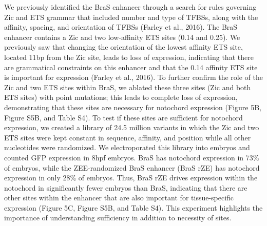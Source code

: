 We previously identified the BraS enhancer through a search for rules governing Zic and ETS grammar that included number and type of TFBSs, along with the affinity, spacing, and orientation of TFBSs (Farley et al., 2016). The BraS enhancer contains a Zic and two low-affinity ETS sites (0.14 and 0.25). We previously saw that changing the orientation of the lowest affinity ETS site, located 11bp from the Zic site, leads to loss of expression, indicating that there are grammatical constraints on this enhancer and that the 0.14 affinity ETS site is important for expression (Farley et al., 2016). To further confirm the role of the Zic and two ETS sites within BraS, we ablated these three sites (Zic and both ETS sites) with point mutations; this leads to complete loss of expression, demonstrating that these sites are necessary for notochord expression (Figure 5B, Figure S5B, and Table S4). To test if these sites are sufficient for notochord expression, we created a library of 24.5 million variants in which  the Zic and two ETS sites were kept constant in sequence, affinity, and position while all other nucleotides were randomized. We electroporated this library into embryos and counted GFP expression in 8hpf embryos. BraS has notochord expression in 73\% of embryos, while the ZEE-randomized BraS enhancer (BraS rZE) has notochord expression in only 28\% of embryos. Thus, BraS rZE drives expression within the notochord in significantly fewer embryos than BraS, indicating that there are other sites within the enhancer that are also important for tissue-specific expression (Figure 5C, Figure S5B, and Table S4). This experiment highlights the importance of understanding sufficiency in addition to necessity of sites.

